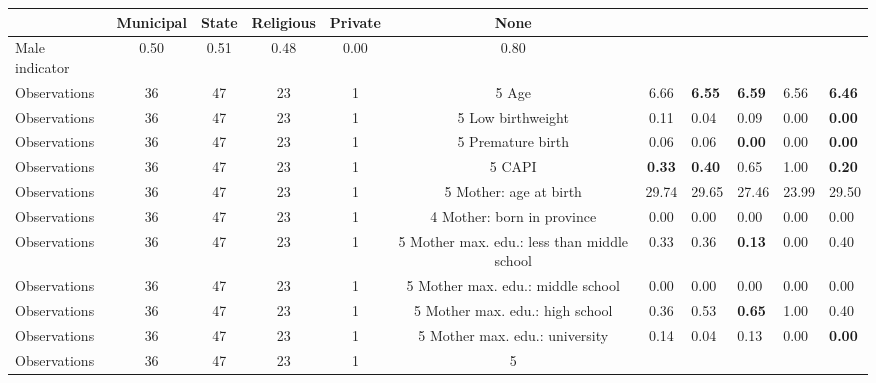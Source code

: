 \begin{tabular}{l c c c c c c }
\toprule
& \textbf{Municipal} & \textbf{State} & \textbf{Religious} & \textbf{Private} & \textbf{None} \\
\midrule
Male indicator &      0.50 &      0.51 &      0.48 &      0.00 &      0.80 \\
\midrule
Observations &        36 &        47 &        23 &         1 &         5
Age &      6.66 & \textbf{     6.55} & \textbf{     6.59} &      6.56 & \textbf{     6.46} \\
\midrule
Observations &        36 &        47 &        23 &         1 &         5
Low birthweight &      0.11 &      0.04 &      0.09 &      0.00 & \textbf{     0.00} \\
\midrule
Observations &        36 &        47 &        23 &         1 &         5
Premature birth &      0.06 &      0.06 & \textbf{     0.00} &      0.00 & \textbf{     0.00} \\
\midrule
Observations &        36 &        47 &        23 &         1 &         5
CAPI & \textbf{     0.33} & \textbf{     0.40} &      0.65 &      1.00 & \textbf{     0.20} \\
\midrule
Observations &        36 &        47 &        23 &         1 &         5
Mother: age at birth &     29.74 &     29.65 &     27.46 &     23.99 &     29.50 \\
\midrule
Observations &        36 &        47 &        23 &         1 &         4
Mother: born in province &      0.00 &      0.00 &      0.00 &      0.00 &      0.00 \\
\midrule
Observations &        36 &        47 &        23 &         1 &         5
Mother max. edu.: less than middle school &      0.33 &      0.36 & \textbf{     0.13} &      0.00 &      0.40 \\
\midrule
Observations &        36 &        47 &        23 &         1 &         5
Mother max. edu.: middle school &      0.00 &      0.00 &      0.00 &      0.00 &      0.00 \\
\midrule
Observations &        36 &        47 &        23 &         1 &         5
Mother max. edu.: high school &      0.36 &      0.53 & \textbf{     0.65} &      1.00 &      0.40 \\
\midrule
Observations &        36 &        47 &        23 &         1 &         5
Mother max. edu.: university &      0.14 &      0.04 &      0.13 &      0.00 & \textbf{     0.00} \\
\midrule
Observations &        36 &        47 &        23 &         1 &         5

\end{tabular}
